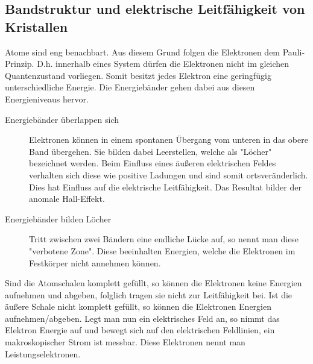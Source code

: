 \subsection{Bandstruktur und elektrische Leitfähigkeit von Kristallen}
Atome sind eng benachbart. Aus diesem Grund folgen die Elektronen dem Pauli-Prinzip.
D.h. innerhalb eines System dürfen die Elektronen nicht im gleichen Quantenzustand vorliegen.
Somit besitzt jedes Elektron eine geringfügig unterschiedliche Energie. Die Energiebänder gehen dabei
aus diesen Energieniveaus hervor.\\
\begin{description}
\item[Energiebänder überlappen sich]
Elektronen können in einem spontanen Übergang vom unteren in das obere Band übergehen. Sie bilden dabei Leerstellen,
welche als "Löcher" bezeichnet werden. Beim Einfluss eines äußeren elektrischen Feldes verhalten sich diese wie
positive Ladungen und sind somit ortsveränderlich.\\
Dies hat Einfluss auf die elektrische Leitfähigkeit. Das Resultat bilder der anomale Hall-Effekt. 
\item[Energiebänder bilden Löcher]
Tritt zwischen zwei Bändern eine endliche Lücke auf, so nennt man diese "verbotene Zone".
Diese beeinhalten Energien, welche die Elektronen im Festkörper nicht annehmen können.
\end{description}
Sind die Atomschalen komplett gefüllt, so können die Elektronen keine Energien aufnehmen und
abgeben, folglich tragen sie nicht zur Leitfähigkeit bei.
Ist die äußere Schale nicht komplett gefüllt, so können die Elektronen Energien aufnehmen/abgeben.
Legt man nun ein elektrisches Feld an, so nimmt das Elektron Energie auf und bewegt sich auf den elektrischen
Feldlinien, ein makroskopischer Strom ist messbar. Diese Elektronen nennt man Leistungselektronen.\\

